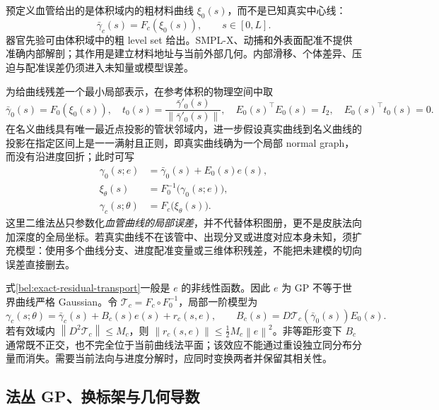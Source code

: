 \documentclass[11pt,a4paper]{article}
\numberwithin{equation}{section}
\theoremstyle{definition}
\newcommand{\norm}[1]{\left\lVert#1\right\rVert}
\begin{document}
预定义血管给出的是体积域内的粗材料曲线 $\xi_0(s)$，而不是已知真实中心线：
\begin{equation}
 \bar\gamma_c(s)=F_c(\xi_0(s)),\qquad s\in[0,L].
 \label{bel:vessel-prior}
\end{equation}
器官先验可由体积域中的粗 level set 给出。SMPL-X、动捕和外表面配准不提供准确内部解剖；其作用是建立材料地址与当前外部几何。内部滑移、个体差异、压迫与配准误差仍须进入未知量或模型误差。

为给曲线残差一个最小局部表示，在参考体积的物理空间中取
\begin{equation}
 \bar\gamma_0(s)=F_0(\xi_0(s)),\quad
 t_0(s)=\frac{\bar\gamma'_0(s)}{\norm{\bar\gamma'_0(s)}},\quad
 E_0(s)^\top E_0(s)=I_2,\quad E_0(s)^\top t_0(s)=0.
 \label{bel:normal-frame}
\end{equation}
在名义曲线具有唯一最近点投影的管状邻域内，进一步假设真实曲线到名义曲线的投影在指定区间上是一一满射且正则，即真实曲线确为一个局部 normal graph，而没有沿进度回折；此时可写
\begin{align}
 \gamma_0(s;e)&=\bar\gamma_0(s)+E_0(s)e(s),\\
 \xi_\theta(s)&=F_0^{-1}\bigl(\gamma_0(s;e)\bigr),\\
 \gamma_c(s;\theta)&=F_c\bigl(\xi_\theta(s)\bigr).
 \label{bel:exact-residual-transport}
\end{align}
这里二维法丛只参数化\emph{血管曲线的局部误差}，并不代替体积图册，更不是皮肤法向加深度的全局坐标。若真实曲线不在该管中、出现分叉或进度对应本身未知，须扩充模型：使用多个曲线分支、进度配准变量或三维体积残差，不能把未建模的切向误差直接删去。

式\eqref{bel:exact-residual-transport}一般是 $e$ 的非线性函数。因此 $e$ 为 GP 不等于世界曲线严格 Gaussian。令 $\mathcal T_c=F_c\circ F_0^{-1}$，局部一阶模型为
\begin{equation}
 \gamma_c(s;\theta)
 =\bar\gamma_c(s)+B_c(s)e(s)+r_c(s,e),\qquad
 B_c(s)=D\mathcal T_c(\bar\gamma_0(s))E_0(s).
 \label{bel:transport-linearization}
\end{equation}
若有效域内 $\norm{D^2\mathcal T_c}\le M_c$，则
$\norm{r_c(s,e)}\le \tfrac12M_c\norm{e}^2$。非等距形变下 $B_c$ 通常既不正交，也不完全位于当前曲线法平面；该效应不能通过重设独立同分布分量而消失。需要当前法向与进度分解时，应同时变换两者并保留其相关性。

\subsection{法丛 GP、换标架与几何导数}
\label{bel:gauge}
\end{document}
